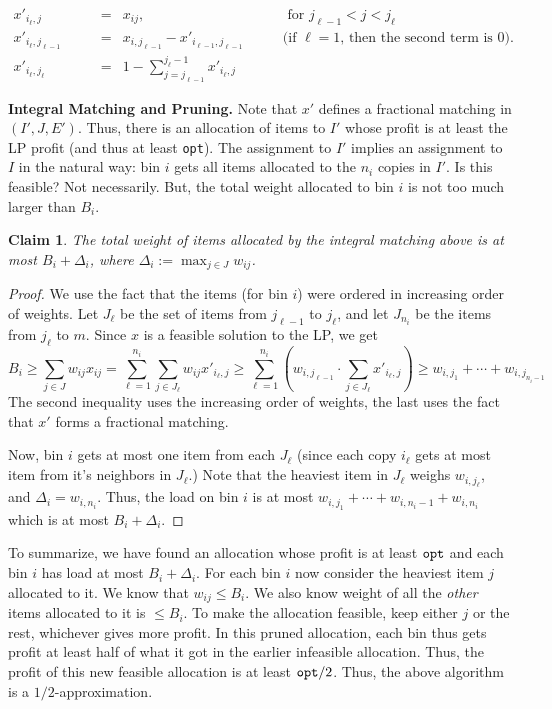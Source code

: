 \documentclass[11pt]{article}
\newtheorem{claim}{Claim}
\def\opt{{\tt opt}}
\begin{document}
\begin{align*}
x'_{i_\ell,j} & \qquad = & x_{ij}, &\qquad  \mbox{ for } j_{\ell - 1} < j < j_{\ell} \\
x'_{i_\ell,j_{\ell-1}} & \qquad = & x_{i,j_{\ell-1}} - x'_{i_{\ell-1},j_{\ell-1}} & \qquad \mbox{(if $\ell = 1$, then the second term is $0$).} \\
x'_{i_\ell,j_\ell} & \qquad = & 1 - \sum_{j=j_{\ell-1}}^{j_\ell - 1} x'_{i_\ell,j} & 
\end{align*}

\noindent
{\bf Integral Matching and Pruning.} Note that $x'$ defines a fractional matching in $(I',J,E')$. Thus, there is an allocation of items to $I'$ whose profit is at least the LP profit (and thus at least \opt). The assignment to $I'$ implies an assignment to $I$ in the natural way: bin $i$ gets all items allocated to the $n_i$ copies in $I'$. 
Is this feasible? Not necessarily. But, the total weight allocated to bin $i$ is not too much larger than $B_i$. 

\begin{claim}
The total weight of items allocated by the integral matching above is at most $B_i + \Delta_i$, 
where $\Delta_i := \max_{j\in J} w_{ij}$. 
\end{claim}
\begin{proof}
We use the fact that the items (for bin $i$) were ordered in increasing order of weights. 
Let $J_\ell$ be the set of items from $j_{\ell -1}$ to $j_\ell$, and let $J_{n_i}$ be the items from 
$j_{\ell}$ to $m$. Since $x$ is a feasible solution to the LP, we get
$$B_i \ge \sum_{j\in J} w_{ij}x_{ij} = \sum_{\ell=1}^{n_i} \sum_{j\in J_\ell} w_{ij}x'_{i_\ell,j} \ge 
\sum_{\ell=1}^{n_i} \left(w_{i,j_{\ell-1}}\cdot \sum_{j\in J_{\ell}} x'_{i_\ell,j}\right) \ge w_{i,j_1} + \cdots + w_{i,j_{n_i-1}}$$
The second inequality uses the increasing order of weights, the last uses the fact that $x'$ forms a fractional matching. 

Now, bin $i$ gets at most one item from each $J_\ell$ (since each copy $i_\ell$ gets at most item from it's 
neighbors in $J_\ell$.) Note that the heaviest item in $J_\ell$ weighs $w_{i,j_\ell}$, and $\Delta_i = w_{i,n_i}$.
Thus, the load on bin $i$ is at most $w_{i,j_1} + \cdots + w_{i,n_i-1} + w_{i,n_i}$
which is at most $B_i + \Delta_i$.
\end{proof}

To summarize, we have found an allocation whose profit is at least $\opt$ and each bin $i$ has load at most $B_i + \Delta_i$. For each bin $i$ now consider the heaviest item $j$ allocated to it. We know that $w_{ij} \le B_i$. We also know weight of all the {\em other} items allocated to it is $\le B_i$. To make the allocation feasible, keep either $j$ or the rest, whichever gives more profit. In this pruned allocation, each bin thus gets profit at least half of what it got in the earlier infeasible allocation. Thus, the profit of this new feasible allocation is at least $\opt/2$. Thus, the above algorithm is a $1/2$-approximation.
\end{document}

